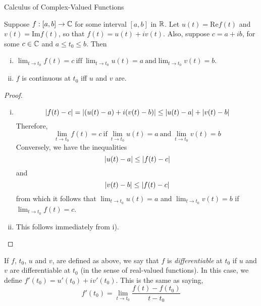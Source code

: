 \begin{section}{Calculus of Complex-Valued Functions}

\begin{prop}
Suppose $f:[a,b] \to \mathbb{C}$ for some interval $[a,b]$ in
$\mathbb{R}$. Let $u(t) = \text{Re} f(t)$ and $v(t) = \text{Im} f(t)$, so that
$f(t) = u(t) + iv(t)$. Also, suppose $c = a +ib$, for some
$c \in \mathbb{C}$ and $a \leq t_0 \leq b$. Then
\begin{enumerate}[i)]
	\item
	$\lim_{t \to t_0} f(t) = c \ \text{iff}
	\ \lim_{t \to t_0} u(t) = a \ \text{and}
	\lim_{t \to t_0} v(t) = b$.

	\item
	$f$ is continuous at $t_0$ iff $u$ and $v$ are.
\end{enumerate}
\end{prop}
\begin{proof}
\bigskip
\begin{enumerate}[i)]
	\item
	\begin{displaymath}
	\left \vert {f(t) - c} \right \vert = \left \vert {(u(t) - a) + i(v(t) - b)} \right \vert
	\leq \left \vert {u(t) - a} \right \vert + \left \vert {v(t) - b} \right \vert
	\end{displaymath}
	Therefore,
	\begin{displaymath}
	\lim_{t \to t_0}f(t) = c \ \text{if} \ 
	\lim_{t \to t_0}u(t) = a \ \text{and} \ 
	\lim_{t \to t_0}v(t) = b
	\end{displaymath}
	Conversely, we have the inequalities
	\begin{displaymath}
	\left \vert {u(t) - a} \right \vert \leq \left \vert {f(t) - c} \right \vert
	\end{displaymath}
	and
	\begin{displaymath}
	\left \vert {v(t) - b} \right \vert \leq \left \vert {f(t) - c} \right \vert
	\end{displaymath}
	from which it follows that $\lim_{t \to t_0}u(t) = a$
	and $\lim_{t \to t_0}v(t) = b$ if $\lim_{t \to t_0}f(t)=c$.
	

	\item
	This follows immediately from i).
\end{enumerate}
\end{proof}







\begin{defn}
	If $f$, $t_0$, $u$ and $v$, are defined as above, we say
	that $f$ is \emph{differentiable} at $t_0$ if $u$ and $v$ are
	differentiable at $t_0$ (in the sense of real-valued functions).
	In this case, we define $f'(t_0) = u'(t_0) + iv'(t_0)$.
	This is the same as saying,
	\begin{displaymath}
	f'(t_0) = \lim_{t \to t_0} \frac{f(t) - f(t_0)}{t - t_0}
	\end{displaymath}
\end{defn}


\end{section}
